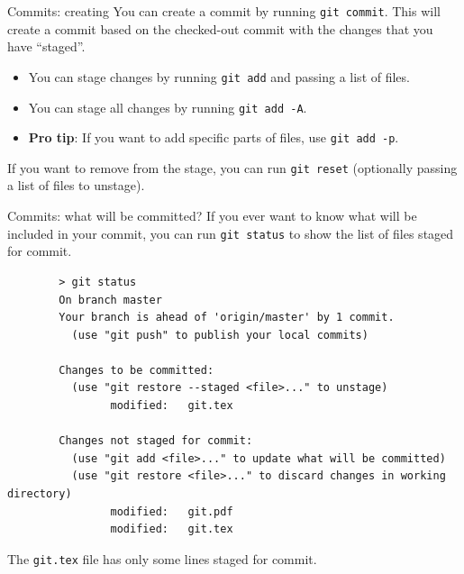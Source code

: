\documentclass{beeper}
\begin{document}
\begin{frame}{Commits: creating}
    You can create a commit by running \texttt{git commit}. This will create a
    commit based on the checked-out commit with the changes that you have
    ``staged''.
    \pause

    \begin{itemize}[<+->]
        \item You can stage changes by running \texttt{git add} and passing a
            list of files.
        \item You can stage all changes by running \texttt{git add -A}.
        \item \textbf{Pro tip}: If you want to add specific parts of files, use
            \texttt{git add -p}.
    \end{itemize}

    \pause[\thebeamerpauses]
    If you want to remove from the stage, you can run \texttt{git reset}
    (optionally passing a list of files to unstage).
\end{frame}

\begin{frame}[fragile]{Commits: what will be committed?}
    If you ever want to know what will be included in your commit, you can run
    \texttt{git status} to show the list of files staged for commit.
    \pause

    {
        \scriptsize
        \begin{verbatim}
        > git status
        On branch master
        Your branch is ahead of 'origin/master' by 1 commit.
          (use "git push" to publish your local commits)

        Changes to be committed:
          (use "git restore --staged <file>..." to unstage)
                modified:   git.tex

        Changes not staged for commit:
          (use "git add <file>..." to update what will be committed)
          (use "git restore <file>..." to discard changes in working directory)
                modified:   git.pdf
                modified:   git.tex
        \end{verbatim}
    }

    \pause
    The \texttt{git.tex} file has only some lines staged for commit.
\end{frame}
\end{document}
